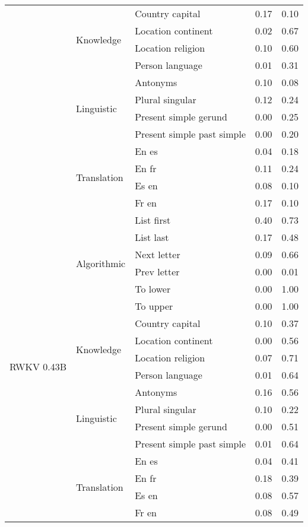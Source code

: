 \begin{center}
\begin{longtable}{lllrr}
 & \multirow[t]{4}{*}{Knowledge} & Country capital & 0.17 & 0.10 \\
 &  & Location continent & 0.02 & 0.67 \\
 &  & Location religion & 0.10 & 0.60 \\
 &  & Person language & 0.01 & 0.31 \\
\cline{2-5}
 & \multirow[t]{4}{*}{Linguistic} & Antonyms & 0.10 & 0.08 \\
 &  & Plural singular & 0.12 & 0.24 \\
 &  & Present simple gerund & 0.00 & 0.25 \\
 &  & Present simple past simple & 0.00 & 0.20 \\
\cline{2-5}
 & \multirow[t]{4}{*}{Translation} & En es & 0.04 & 0.18 \\
 &  & En fr & 0.11 & 0.24 \\
 &  & Es en & 0.08 & 0.10 \\
 &  & Fr en & 0.17 & 0.10 \\
\cline{1-5} \cline{2-5}
\multirow[t]{18}{*}{RWKV 0.43B} & \multirow[t]{6}{*}{Algorithmic} & List first & 0.40 & 0.73 \\
 &  & List last & 0.17 & 0.48 \\
 &  & Next letter & 0.09 & 0.66 \\
 &  & Prev letter & 0.00 & 0.01 \\
 &  & To lower & 0.00 & 1.00 \\
 &  & To upper & 0.00 & 1.00 \\
\cline{2-5}
 & \multirow[t]{4}{*}{Knowledge} & Country capital & 0.10 & 0.37 \\
 &  & Location continent & 0.00 & 0.56 \\
 &  & Location religion & 0.07 & 0.71 \\
 &  & Person language & 0.01 & 0.64 \\
\cline{2-5}
 & \multirow[t]{4}{*}{Linguistic} & Antonyms & 0.16 & 0.56 \\
 &  & Plural singular & 0.10 & 0.22 \\
 &  & Present simple gerund & 0.00 & 0.51 \\
 &  & Present simple past simple & 0.01 & 0.64 \\
\cline{2-5}
 & \multirow[t]{4}{*}{Translation} & En es & 0.04 & 0.41 \\
 &  & En fr & 0.18 & 0.39 \\
 &  & Es en & 0.08 & 0.57 \\
 &  & Fr en & 0.08 & 0.49 \\

\end{longtable}
\end{center}
